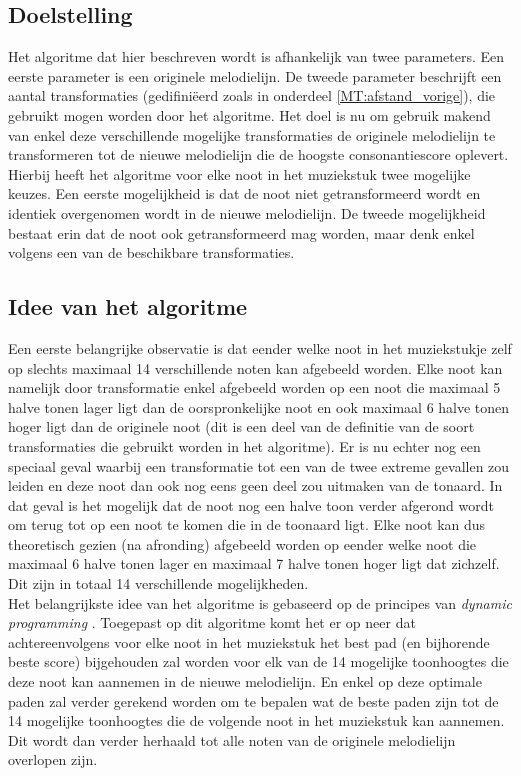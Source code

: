 \subsection{Doelstelling}
Het algoritme dat hier beschreven wordt is afhankelijk van twee parameters. Een eerste parameter is een originele melodielijn. De tweede parameter beschrijft een aantal transformaties (gedifini\"eerd zoals in onderdeel \ref{MT:afstand_vorige}), die gebruikt mogen worden door het algoritme. Het doel is nu om gebruik makend van enkel deze verschillende mogelijke transformaties de originele melodielijn te transformeren tot de nieuwe melodielijn die de hoogste consonantiescore oplevert. Hierbij heeft het algoritme voor elke noot in het muziekstuk twee mogelijke keuzes. Een eerste mogelijkheid is dat de noot niet getransformeerd wordt en identiek overgenomen wordt in de nieuwe melodielijn. De tweede mogelijkheid bestaat erin dat de noot ook getransformeerd mag worden, maar denk enkel volgens een van de beschikbare transformaties.

\subsection{Idee van het algoritme}
Een eerste belangrijke observatie is dat eender welke noot in het muziekstukje zelf op slechts maximaal 14 verschillende noten kan afgebeeld worden. Elke noot kan namelijk door transformatie enkel afgebeeld worden op een noot die maximaal 5 halve tonen lager ligt dan de oorspronkelijke noot en ook maximaal 6 halve tonen hoger ligt dan de originele noot (dit is een deel van de definitie van de soort transformaties die gebruikt worden in het algoritme). Er is nu echter nog een speciaal geval waarbij een transformatie tot een van de twee extreme gevallen zou leiden en deze noot dan ook nog eens geen deel zou uitmaken van de tonaard. In dat geval is het mogelijk dat de noot nog een halve toon verder afgerond wordt om terug tot op een noot te komen die in de toonaard ligt. Elke noot kan dus theoretisch gezien (na afronding) afgebeeld worden op eender welke noot die maximaal 6 halve tonen lager en maximaal 7 halve tonen hoger ligt dat zichzelf. Dit zijn in totaal 14 verschillende mogelijkheden.\\
Het belangrijkste idee van het algoritme is gebaseerd op de principes van \textit{dynamic programming} \cite{url:DP}. Toegepast op dit algoritme komt het er op neer dat achtereenvolgens voor elke noot in het muziekstuk het best pad (en bijhorende beste score) bijgehouden zal worden voor elk van de 14 mogelijke toonhoogtes die deze noot kan aannemen in de nieuwe melodielijn. En enkel op deze optimale paden zal verder gerekend worden om te bepalen wat de beste paden zijn tot de 14 mogelijke toonhoogtes die de volgende noot in het muziekstuk kan aannemen. Dit wordt dan verder herhaald tot alle noten van de originele melodielijn overlopen zijn.

